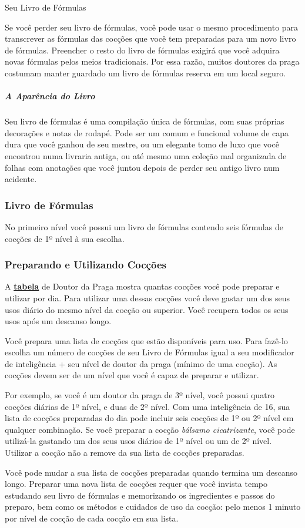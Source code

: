 \documentclass[letterpaper,twocolumn,openany]{dndbook}
\begin{document}
\begin{paperbox}[float=!b]{Seu Livro de Fórmulas}
		\par Se você perder seu livro de fórmulas, você pode usar o mesmo procedimento para transcrever as fórmulas das cocções que você tem preparadas para um novo livro de fórmulas. Preencher o resto do livro de fórmulas exigirá que você adquira novas fórmulas pelos meios tradicionais. Por essa razão, muitos doutores da praga costumam manter guardado um livro de fórmulas reserva em um local seguro.
		\subparagraph{A Aparência do Livro} Seu livro de fórmulas é uma compilação única de fórmulas, com suas próprias decorações e notas de rodapé. Pode ser um comum e funcional volume de capa dura que você ganhou de seu mestre, ou um elegante tomo de luxo que você encontrou numa livraria antiga, ou até mesmo uma coleção mal organizada de folhas com anotações que você juntou depois de perder seu antigo livro num acidente.
	\end{paperbox}

	\subsubsection{Livro de Fórmulas}
	No primeiro nível você possui um livro de fórmulas contendo seis fórmulas de cocções de 1º nível à sua escolha.
	
	\subsubsection{Preparando e Utilizando Cocções}
	A \hyperref[tab:doutor_da_praga]{\textbf{tabela}} de Doutor da Praga mostra quantas cocções você pode preparar e utilizar por dia. Para utilizar uma dessas cocções você deve gastar um dos seus usos diário do mesmo nível da cocção ou superior. Você recupera todos os seus usos após um descanso longo.
	\par Você prepara uma lista de cocções que estão disponíveis para uso. Para fazê-lo escolha um número de cocções de seu Livro de Fórmulas igual a seu modificador de inteligência + seu nível de doutor da praga (mínimo de uma cocção). As cocções devem ser de um nível que você é capaz de preparar e utilizar.
	\par Por exemplo, se você é um doutor da praga de 3º nível, você possui quatro cocções diárias de 1º nível, e duas de 2º nível. Com uma inteligência de 16, sua lista de cocções preparadas do dia pode incluir seis cocções de 1º ou 2º nível em qualquer combinação. Se você preparar a cocção \textit{bálsamo cicatrizante}, você pode utilizá-la gastando um dos seus usos diários de 1º nível ou um de 2º nível. Utilizar a cocção não a remove da sua lista de cocções preparadas.
	\par Você pode mudar a sua lista de cocções preparadas quando termina um descanso longo. Preparar uma nova lista de cocções requer que você invista tempo estudando seu livro de fórmulas e memorizando os ingredientes e passos do preparo, bem como os métodos e cuidados de uso da cocção: pelo menos 1 minuto por nível de cocção de cada cocção em sua lista.
	
\end{document}
